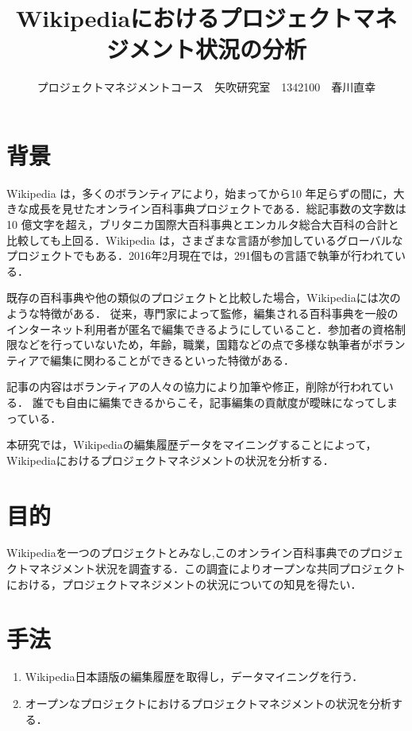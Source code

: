 \documentclass[uplatex,twocolumn,dvipdfmx]{jsarticle}
\title{\vspace{-5mm}\fontsize{14pt}{0pt}\selectfont Wikipediaにおけるプロジェクトマネジメント状況の分析}
\author{\normalsize プロジェクトマネジメントコース　矢吹研究室　1342100　春川直幸}
\date{}
\begin{document}
\fontsize{10.5pt}{\baselineskip}\selectfont
\maketitle


\section{背景}

Wikipedia は，多くのボランティアにより，始まってから10 年足らずの間に，大きな成長を見せたオンライン百科事典プロジェクトである．総記事数の文字数は10 億文字を超え，ブリタニカ国際大百科事典とエンカルタ総合大百科の合計と比較しても上回る．Wikipedia は，さまざまな言語が参加しているグローバルなプロジェクトでもある\cite{wikirevo}．2016年2月現在では，291個もの言語で執筆が行われている．

既存の百科事典や他の類似のプロジェクトと比較した場合，Wikipediaには次のような特徴がある．
従来，専門家によって監修，編集される百科事典を一般のインターネット利用者が匿名で編集できるようにしていること．参加者の資格制限などを行っていないため，年齢，職業，国籍などの点で多様な執筆者がボランティアで編集に関わることができるといった特徴がある\cite{wiki}．

記事の内容はボランティアの人々の協力により加筆や修正，削除が行われている．
誰でも自由に編集できるからこそ，記事編集の貢献度が曖昧になってしまっている．

本研究では，Wikipediaの編集履歴データをマイニングすることによって，Wikipediaにおけるプロジェクトマネジメントの状況を分析する．




\section{目的}

Wikipediaを一つのプロジェクトとみなし,このオンライン百科事典でのプロジェクトマネジメント状況を調査する．この調査によりオープンな共同プロジェクトにおける，プロジェクトマネジメントの状況についての知見を得たい．

\section{手法}

\begin{enumerate}
 \item Wikipedia日本語版の編集履歴を取得し，データマイニングを行う．
 \item オープンなプロジェクトにおけるプロジェクトマネジメントの状況を分析する．
\end{enumerate}
\end{document}
